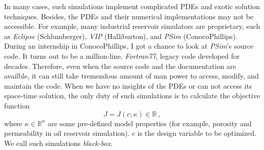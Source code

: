 \documentclass[a4paper,onecolumn]{article}
\theoremstyle{remark}
\begin{document}
\noindent In many cases, such simulations implement complicated PDEs and exotic solution techniques.
Besides, the PDEs and their numerical implementations may not
be accessible. For example, many industrial reservoir simulators are proprietary, such as \textit{Eclipse} (Schlumberger), 
\textit{VIP} (Halliburton), and \textit{PSim} (ConocoPhillips). During an internship in ConocoPhillips, 
I got a chance to
look at \textit{PSim}'s source code. It turns out to be a million-line, \textit{Fortran77}, legacy code developed for decades.
Therefore, even when the source code and the documentation are availble, it can still take tremendous amount of man power
to access, modify, and maintain the code.
When we have no insights of the PDEs or can not access its space-time solution,
the only duty of such simulations is to calculate the objective function
\begin{equation}
    J = J(c;\kappa) \in \mathbb{R}\,,
\end{equation}
where $\kappa\in \mathbb{R}^n$ are some pre-defined model properties (for example, porosity and permeability in oil reservoir simulation).
$c$ is the design variable to be optimized. 
We call such simulations \emph{black-box}.\\
\end{document}

